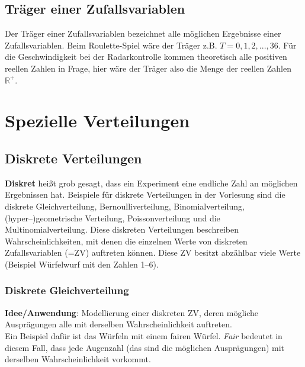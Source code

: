 \documentclass[a4paper]{article}
\newcommand{\R}{\mathbb{R}}
\begin{document}
\subsection{Träger einer Zufallsvariablen} \label{sec:Traeger}

Der Träger einer Zufallsvariablen bezeichnet alle möglichen Ergebnisse einer Zufallsvariablen. Beim Roulette-Spiel wäre der Träger z.B. $ T = 0,1,2,...,36$. Für die Geschwindigkeit bei der Radarkontrolle kommen theoretisch alle positiven reellen Zahlen in Frage, hier wäre der Träger also die Menge der reellen Zahlen $\R^+$.

\newpage

\section{Spezielle Verteilungen} \label{sec:Distr}

\subsection{Diskrete Verteilungen} \label{sec:discretedistr}
\textbf{Diskret} heißt grob gesagt, dass ein Experiment eine endliche Zahl an möglichen Ergebnissen hat. Beispiele für diskrete Verteilungen in der Vorlesung sind die diskrete Gleichverteilung, Bernoulliverteilung, Binomialverteilung, (hyper--)geometrische Verteilung, Poissonverteilung und die Multinomialverteilung. Diese diskreten Verteilungen beschreiben Wahrscheinlichkeiten, mit denen die einzelnen Werte von diskreten Zufallsvariablen (=ZV) auftreten können. Diese ZV besitzt abzählbar viele Werte (Beispiel Würfelwurf mit den Zahlen 1--6).


\subsubsection{Diskrete Gleichverteilung} \label{sec:duni}

\noindent \textbf{Idee/Anwendung}: Modellierung einer diskreten ZV, deren mögliche Ausprägungen alle mit derselben Wahrscheinlichkeit auftreten. \\

\noindent Ein Beispiel dafür ist das Würfeln mit einem fairen Würfel. \textit{Fair} bedeutet in diesem Fall, dass jede Augenzahl (das sind die möglichen Ausprägungen) mit derselben Wahrscheinlichkeit vorkommt. \\
\end{document}
